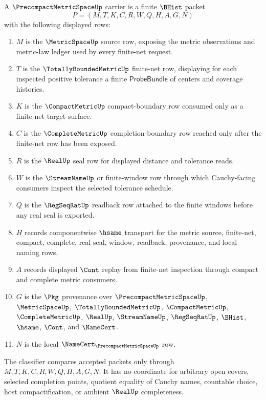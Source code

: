 \begin{definition}
\label{def:precompact-metric-space-carrier}
A $\PrecompactMetricSpaceUp$ carrier is a finite $\BHist$ packet
$$
P=(M,T,K,C,R,W,Q,H,A,G,N)
$$
with the following displayed rows:
\begin{enumerate}
\item $M$ is the $\MetricSpaceUp$ source row, exposing the metric observations and metric-law ledger used by every finite-net request.
\item $T$ is the $\TotallyBoundedMetricUp$ finite-net row, displaying for each inspected positive tolerance a finite $\mathsf{ProbeBundle}$ of centers and coverage histories.
\item $K$ is the $\CompactMetricUp$ compact-boundary row consumed only as a finite-net target surface.
\item $C$ is the $\CompleteMetricUp$ completion-boundary row reached only after the finite-net row has been exposed.
\item $R$ is the $\RealUp$ seal row for displayed distance and tolerance reads.
\item $W$ is the $\StreamNameUp$ or finite-window row through which Cauchy-facing consumers inspect the selected tolerance schedule.
\item $Q$ is the $\RegSeqRatUp$ readback row attached to the finite windows before any real seal is exported.
\item $H$ records componentwise $\hsame$ transport for the metric source, finite-net, compact, complete, real-seal, window, readback, provenance, and local naming rows.
\item $A$ records displayed $\Cont$ replay from finite-net inspection through compact and complete metric consumers.
\item $G$ is the $\Pkg$ provenance over $\PrecompactMetricSpaceUp$, $\MetricSpaceUp$, $\TotallyBoundedMetricUp$, $\CompactMetricUp$, $\CompleteMetricUp$, $\RealUp$, $\StreamNameUp$, $\RegSeqRatUp$, $\BHist$, $\hsame$, $\Cont$, and $\NameCert$.
\item $N$ is the local $\NameCert_{\PrecompactMetricSpaceUp}$ row.
\end{enumerate}
The classifier compares accepted packets only through $M,T,K,C,R,W,Q,H,A,G,N$. It has no coordinate for arbitrary open covers, selected completion points, quotient equality of Cauchy names, countable choice, host compactification, or ambient $\RealUp$ completeness.
\end{definition}

